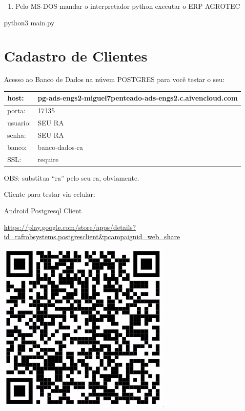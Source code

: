 \documentclass[
]{book}
\newenvironment{Shaded}{\begin{snugshade}}{\end{snugshade}}
\newcommand{\NormalTok}[1]{#1}
\providecommand{\tightlist}{%
  \setlength{\itemsep}{0pt}\setlength{\parskip}{0pt}}
\begin{document}
\begin{enumerate}
\def\labelenumi{\arabic{enumi}.}
\setcounter{enumi}{4}
\tightlist
\item
  Pelo MS-DOS mandar o interpretador python executar o ERP AGROTEC
\end{enumerate}

\begin{Shaded}
\begin{Highlighting}[]
\NormalTok{python3 main.py}
\end{Highlighting}
\end{Shaded}

\section{Cadastro de Clientes}\label{cadastro-de-clientes}

Acesso ao Banco de Dados na núvem POSTGRES para você testar o seu:

\begin{longtable}[]{@{}ll@{}}
\toprule\noalign{}
host: & pg-ads-engs2-miguel7penteado-ads-engs2.c.aivencloud.com \\
\midrule\noalign{}
\endhead
\bottomrule\noalign{}
\endlastfoot
porta: & 17135 \\
usuario: & SEU RA \\
senha: & SEU RA \\
banco: & banco-dados-ra \\
SSL: & require \\
\end{longtable}

OBS: substitua ``ra'' pelo seu ra, obviamente.

Cliente para testar via celular:

Android Postgresql Client

\url{https://play.google.com/store/apps/details?id=rafrobsystems.postgresclient&pcampaignid=web_share}

\includegraphics{images/clipboard-78059825.png}
\end{document}
